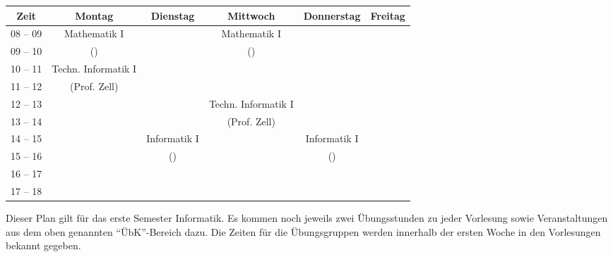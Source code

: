 \begin{minipage}{\textwidth}
    \footnotesize
\begin{center}
	\begin{tabular}{|c|c|c|c|c|c|}
	\hline
	 Zeit     &    Montag                    & Dienstag          & Mittwoch          	& Donnerstag & Freitag \\ \hline\hline
	 08 -- 09 &    Mathematik I              &                   & Mathematik I      	&  &  \\ \cline{1-1} \cline{3-3} \cline{5-6} 
	 09 -- 10 &    (\Matheprof)              &                   & (\Matheprof) 		&  &  \\ \hline
	 10 -- 11 &    Techn. Informatik I		 &                   &                   	&  &  \\ \cline{1-1} \cline{3-6}
	 11 -- 12 &    (Prof. Zell)				 &                   &                   	&  &  \\ \hline
	 12 -- 13 &                              &                   & Techn. Informatik I 	&  &  \\ \cline{1-3} \cline{5-6}
	 13 -- 14 &                              &                   & (Prof. Zell)      	&  &  \\ \hline
	 14 -- 15 &                              & Informatik I  	 &                 			&  Informatik I &  \\ \cline{1-2} \cline{4-4} \cline{6-6}
	 15 -- 16 &                              & (\Infoprof)  &                   	&  (\Infoprof) &  \\ \hline
	 16 -- 17 &                              &                   &                   	&  &  \\ \hline
	 17 -- 18 &                              &                   &                   	&  &  \\ \hline
	\end{tabular}
	
\end{center}
\end{minipage}
Dieser Plan gilt für das erste Semester Informatik. Es kommen noch jeweils zwei Übungsstunden zu jeder Vorlesung 
sowie Veranstaltungen aus dem oben genannten "`\"UbK"'-Bereich dazu.
Die Zeiten für die Übungsgruppen werden innerhalb der ersten Woche in den Vorlesungen bekannt gegeben.
